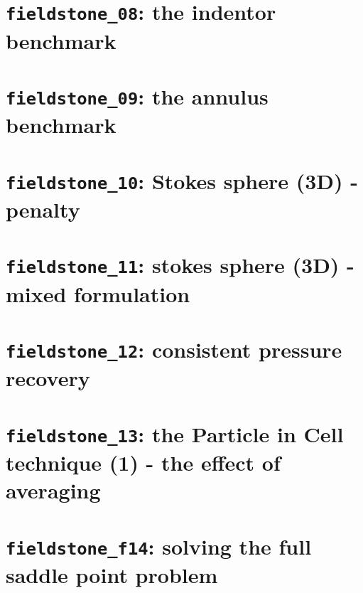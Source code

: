 \documentclass[a4paper]{article}
\begin{document}
\newpage
\section{{\tt fieldstone\_08}: the indentor benchmark \label{f08}}


\newpage
\section{{\tt fieldstone\_09}: the annulus benchmark \label{f09}}



\newpage
\section{{\tt fieldstone\_10}: Stokes sphere (3D) - penalty \label{f10}}


\newpage
\section{{\tt fieldstone\_11}: stokes sphere (3D) - mixed formulation \label{f11}}


\newpage
\section{{\tt fieldstone\_12}: consistent pressure recovery \label{f12}}


\newpage
\section{{\tt fieldstone\_13}: the Particle in Cell technique (1) - the effect of averaging \label{f13}}


\newpage
\section{{\tt fieldstone\_f14}: solving the full saddle point problem \label{f14}}

\end{document}
